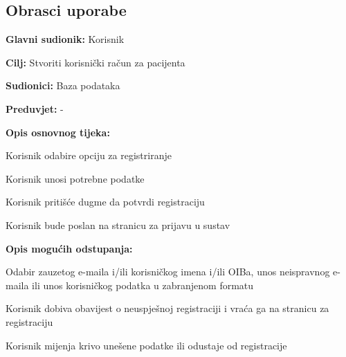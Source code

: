 \eject 



\subsection{Obrasci uporabe}


\noindent {}
\begin{packed_item}
	
	\item \textbf{Glavni sudionik: }Korisnik
	\item  \textbf{Cilj:} Stvoriti korisnički račun za pacijenta
	\item  \textbf{Sudionici:} Baza podataka
	\item  \textbf{Preduvjet:} -
	\item  \textbf{Opis osnovnog tijeka:}
	
	\item[] \begin{packed_enum}
		
		\item Korisnik odabire opciju za registriranje
		\item Korisnik unosi potrebne podatke
		\item Korisnik pritišće dugme da potvrdi registraciju
		\item Korisnik bude poslan na stranicu za prijavu u sustav
	\end{packed_enum}
	
	\item  \textbf{Opis mogućih odstupanja:}
	
	\item[] \begin{packed_item}
		
		\item[2.a] Odabir zauzetog e-maila i/ili korisničkog imena i/ili OIBa, unos neispravnog e-maila ili unos korisničkog podatka u zabranjenom formatu
		\item[] \begin{packed_enum}
			
			\item Korisnik dobiva obavijest o neuspješnoj registraciji i vraća ga na stranicu za registraciju
			\item Korisnik mijenja krivo unešene podatke ili odustaje od registracije
			
		\end{packed_enum}
		
	\end{packed_item}
\end{packed_item}

